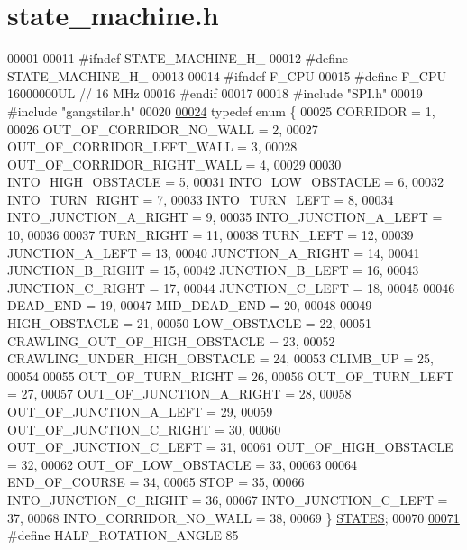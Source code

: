 \hypertarget{state__machine_8h_source}{}\section{state\+\_\+machine.\+h}
\label{state__machine_8h_source}

\begin{DoxyCode}
00001 
00011 \textcolor{preprocessor}{#ifndef STATE\_MACHINE\_H\_}
00012 \textcolor{preprocessor}{#define STATE\_MACHINE\_H\_}
00013 
00014 \textcolor{preprocessor}{#ifndef F\_CPU}
00015 \textcolor{preprocessor}{#define F\_CPU 16000000UL        // 16 MHz}
00016 \textcolor{preprocessor}{#endif}
00017 
00018 \textcolor{preprocessor}{#include "SPI.h"}
00019 \textcolor{preprocessor}{#include "gangstilar.h"}
00020 
\hypertarget{state__machine_8h_source.tex_l00024}{}\hyperlink{state__machine_8h_a94b1da2e055fff4d143aa6aa891f79a9}{00024} \textcolor{keyword}{typedef} \textcolor{keyword}{enum} \{
00025     CORRIDOR = 1, 
00026     OUT\_OF\_CORRIDOR\_NO\_WALL = 2, 
00027     OUT\_OF\_CORRIDOR\_LEFT\_WALL = 3, 
00028     OUT\_OF\_CORRIDOR\_RIGHT\_WALL = 4,
00029     
00030     INTO\_HIGH\_OBSTACLE = 5, 
00031     INTO\_LOW\_OBSTACLE = 6, 
00032     INTO\_TURN\_RIGHT = 7,  
00033     INTO\_TURN\_LEFT = 8, 
00034     INTO\_JUNCTION\_A\_RIGHT = 9, 
00035     INTO\_JUNCTION\_A\_LEFT = 10,
00036     
00037     TURN\_RIGHT = 11, 
00038     TURN\_LEFT = 12, 
00039     JUNCTION\_A\_LEFT = 13, 
00040     JUNCTION\_A\_RIGHT = 14, 
00041     JUNCTION\_B\_RIGHT = 15, 
00042     JUNCTION\_B\_LEFT = 16, 
00043     JUNCTION\_C\_RIGHT = 17, 
00044     JUNCTION\_C\_LEFT = 18, 
00045     
00046     DEAD\_END = 19,
00047     MID\_DEAD\_END = 20,
00048     
00049     HIGH\_OBSTACLE = 21, 
00050     LOW\_OBSTACLE = 22, 
00051     CRAWLING\_OUT\_OF\_HIGH\_OBSTACLE = 23, 
00052     CRAWLING\_UNDER\_HIGH\_OBSTACLE = 24, 
00053     CLIMB\_UP = 25,
00054     
00055     OUT\_OF\_TURN\_RIGHT = 26, 
00056     OUT\_OF\_TURN\_LEFT = 27, 
00057     OUT\_OF\_JUNCTION\_A\_RIGHT = 28, 
00058     OUT\_OF\_JUNCTION\_A\_LEFT = 29, 
00059     OUT\_OF\_JUNCTION\_C\_RIGHT = 30, 
00060     OUT\_OF\_JUNCTION\_C\_LEFT = 31, 
00061     OUT\_OF\_HIGH\_OBSTACLE = 32, 
00062     OUT\_OF\_LOW\_OBSTACLE = 33,
00063     
00064     END\_OF\_COURSE = 34, 
00065     STOP = 35,
00066     INTO\_JUNCTION\_C\_RIGHT = 36,
00067     INTO\_JUNCTION\_C\_LEFT = 37,
00068     INTO\_CORRIDOR\_NO\_WALL = 38,
00069 \} \hyperlink{state__machine_8h_a94b1da2e055fff4d143aa6aa891f79a9}{STATES};
00070 
\hypertarget{state__machine_8h_source.tex_l00071}{}\hyperlink{state__machine_8h_a5776a711f0156180fe5efb79c9ffc24f}{00071} \textcolor{preprocessor}{#define HALF\_ROTATION\_ANGLE 85          }

\end{DoxyCode}
